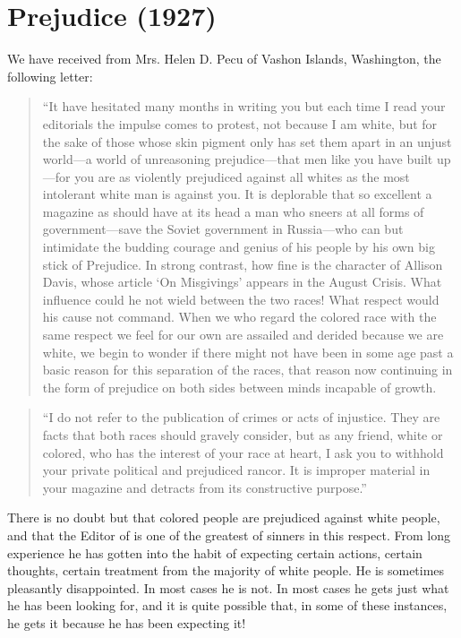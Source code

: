 \documentclass[letterpaper,10pt,english]{jupyterBook}
\begin{document}
\section{Prejudice (1927)}
\label{\detokenize{Volumes/34/09/prejudice:prejudice-1927}}\label{\detokenize{Volumes/34/09/prejudice::doc}}
\sphinxAtStartPar
We have received from Mrs. Helen D. Pecu of Vashon Islands, Washington, the following letter:
\begin{quote}

\sphinxAtStartPar
“It have hesitated many months in writing you but each time I read your editorials the impulse comes to protest, not because I am white, but for the sake of those whose skin pigment only has set them apart in an unjust world—a world of unreasoning prejudice—that men like you have built up —for you are as violently prejudiced against all whites as the most intolerant white man is against you. It is deplorable that so excellent a magazine as   should have at its head a man who sneers at all forms of government—save the Soviet government in Russia—who can but intimidate the budding courage and genius of his people by his own big stick of Prejudice. In strong contrast, how fine is the character of Allison Davis, whose article ‘On Misgivings’ appears in the August Crisis. What influence could he not wield between the two races! What respect would his cause not command. When we who regard the colored race with the same respect we feel for our own are assailed and derided because we are white, we begin to wonder if there might not have been in some age past a basic reason for this separation of the races, that reason now continuing in the form of prejudice on both sides between minds incapable of growth.
\end{quote}
\begin{quote}

\sphinxAtStartPar
“I do not refer to the publication of crimes or acts of injustice. They are facts that both races should gravely consider, but as any friend, white or colored, who has the interest of your race at heart, I ask you to withhold your private political and prejudiced rancor. It is improper material in your magazine and detracts from its constructive purpose.”
\end{quote}

\sphinxAtStartPar
There is no doubt but that colored people are prejudiced against white people, and that the Editor of  is one of the greatest of sinners in this respect. From long experience he has gotten into the habit of expecting certain actions, certain thoughts, certain treatment from the majority of white people. He is sometimes pleasantly disappointed. In most cases he is not. In most cases he gets just what he has been looking for, and it is quite possible that, in some of these instances, he gets it because he has been expecting it!
\end{document}
